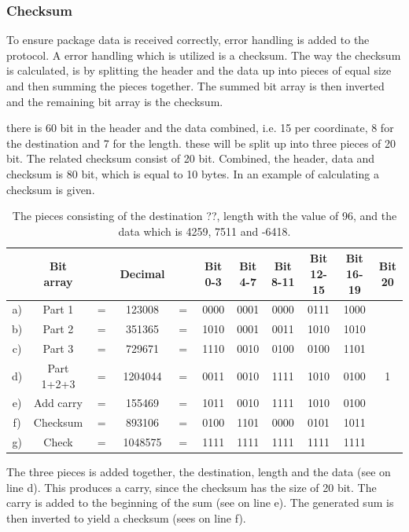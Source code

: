\subsubsection{Checksum}
To ensure package data is received correctly, error handling is added to the protocol. A error handling which is utilized is a checksum. The way the checksum is calculated, is by splitting the header and the data up into pieces of equal size and then summing the pieces together. The summed bit array is then inverted and the remaining bit array is the checksum. 

there is 60 bit in the header and the data combined, i.e. 15 per coordinate, 8 for the destination and 7 for the length. these will be split up into three pieces of 20 bit. The related checksum consist of 20 bit. Combined, the header, data and checksum is 80 bit, which is equal to 10 bytes. In  an example of calculating a checksum is given.

\begin{table}[H]
\centering
\begin{tabular}{c c c c c c c c c c c}
   & Bit array  &     & Decimal &     & Bit 0-3 & Bit 4-7 & Bit 8-11 & Bit 12-15 & Bit 16-19 & Bit 20 \\
\hline
a) & Part 1     & $=$ & 123008  & $=$ & 0000 & 0001 & 0000 & 0111 & 1000 & \\
b) & Part 2     & $=$ & 351365  & $=$ & 1010 & 0001 & 0011 & 1010 & 1010 & \\
c) & Part 3     & $=$ & 729671  & $=$ & 1110 & 0010 & 0100 & 0100 & 1101 & \\
d) & Part 1+2+3 & $=$ & 1204044 & $=$ & 0011 & 0010 & 1111 & 1010 & 0100 & 1 \\
e) & Add carry  & $=$ & 155469  & $=$ & 1011 & 0010 & 1111 & 1010 & 0100 & \\
f) & Checksum   & $=$ & 893106  & $=$ & 0100 & 1101 & 0000 & 0101 & 1011 & \\
g) & Check      & $=$ & 1048575 & $=$ & 1111 & 1111 & 1111 & 1111 & 1111 & \\
\end{tabular}
\caption{The pieces consisting of the destination ??, length with the value of 96, and the data which is 4259, 7511 and -6418.}
\label{ChecksumExp}
\end{table}

The three pieces is added together, the destination, length and the data (see on line d). This produces a carry, since the checksum has the size of 20 bit. The carry is added to the beginning of the sum (see on line e). The generated sum is then inverted to yield a checksum (sees on line f).

